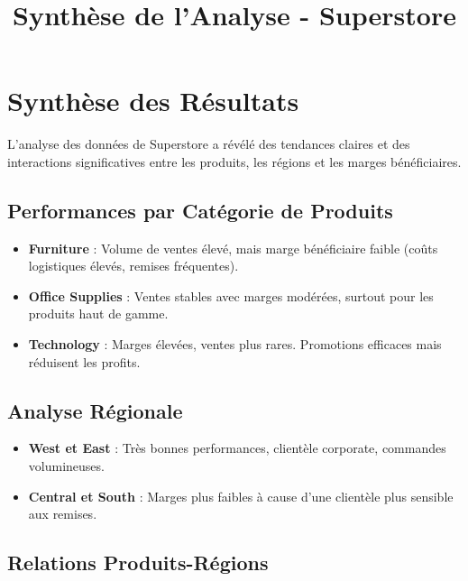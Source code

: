 \documentclass[
]{article}
\title{Synthèse de l'Analyse - Superstore}
\author{}
\date{\vspace{-2.5em}}
\providecommand{\tightlist}{%
  \setlength{\itemsep}{0pt}\setlength{\parskip}{0pt}}
\begin{document}
\maketitle

\section{Synthèse des Résultats}\label{synthuxe8se-des-ruxe9sultats}

L'analyse des données de Superstore a révélé des tendances claires et
des interactions significatives entre les produits, les régions et les
marges bénéficiaires.

\subsection{Performances par Catégorie de
Produits}\label{performances-par-catuxe9gorie-de-produits}

\begin{itemize}
\tightlist
\item
  \textbf{Furniture} : Volume de ventes élevé, mais marge bénéficiaire
  faible (coûts logistiques élevés, remises fréquentes).
\item
  \textbf{Office Supplies} : Ventes stables avec marges modérées,
  surtout pour les produits haut de gamme.
\item
  \textbf{Technology} : Marges élevées, ventes plus rares. Promotions
  efficaces mais réduisent les profits.
\end{itemize}

\subsection{Analyse Régionale}\label{analyse-ruxe9gionale}

\begin{itemize}
\tightlist
\item
  \textbf{West et East} : Très bonnes performances, clientèle corporate,
  commandes volumineuses.
\item
  \textbf{Central et South} : Marges plus faibles à cause d'une
  clientèle plus sensible aux remises.
\end{itemize}

\subsection{Relations
Produits-Régions}\label{relations-produits-ruxe9gions}
\end{document}
